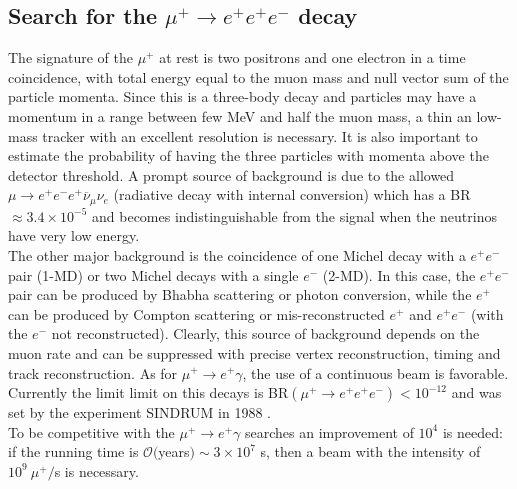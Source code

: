 \documentclass[12pt,a4paper,openright, oneside, titlepage]{book} %
\begin{document}
\subsection{Search for the $\mu^+ \rightarrow e^+ e^+e^-$ decay}
The signature of the $\mu^+$ at rest is two positrons and one electron in a time coincidence, 
with total energy equal to the muon mass and null vector sum of the particle momenta.
Since this is a three-body decay and particles may have a momentum in a range between
few MeV and half the muon mass, a thin an low-mass tracker with an excellent resolution is necessary.
It is also important to estimate the probability of having the three particles with momenta above the detector threshold.
A prompt source of background is due to the allowed 
$\mu\rightarrow e^+e^-e^+\overline{\nu}_{\mu}\nu_e$ (radiative decay with internal conversion) 
which has a BR$\approx 3.4\times 10^{-5}$ 
and becomes indistinguishable from the signal when the neutrinos have very low energy. \\
The other major background is the coincidence of one Michel decay with a $e^+e^-$ pair (1-MD) or two Michel decays with a single $e^-$ (2-MD). 
In this case, the $e^+e^-$ pair can be produced by Bhabha scattering or photon conversion, 
while the $e^+$ can be produced by Compton scattering or mis-reconstructed $e^+$ and $e^+e^-$ (with the $e^-$ not reconstructed). Clearly, this source of background depends on the muon rate and can be suppressed 
with precise vertex reconstruction, timing and track reconstruction.
As for $\mu^+ \rightarrow e^+ \gamma$, the use of a continuous beam is favorable.\\
Currently the limit limit on this decays is BR$(\mu^+ \rightarrow e^+ e^+e^-)<10^{-12}$ and was set by the experiment SINDRUM in 1988 \cite{SINDRUM}.\\
To be competitive with the $\mu^+\rightarrow e^+\gamma$ searches an improvement of $10^4$ is needed: if the running time is $\mathcal{O}($years$)\sim 3\times 10^7$ s, then a beam with the intensity of $10^9\ \mu^+/$s is necessary.
\end{document}
